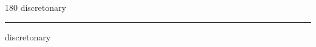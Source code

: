 
\begin{frame}
\begin{center}
\begin{turn}{180}
{\fontsize{2.5cm}{1em}\selectfont discretonary}
\end{turn}
\vspace{1em}\par  
\hrule
\vspace{1em}\par  
{\fontsize{2.5cm}{1em}\selectfont discretonary}
\end{center}
\end{frame}
